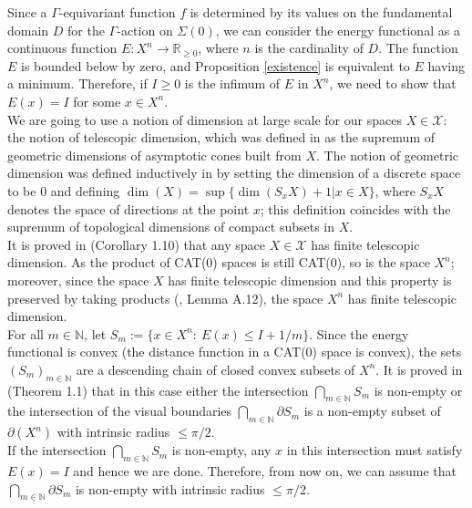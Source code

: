 \documentclass{article}
\theoremstyle{definition}
\theoremstyle{remark}
\theoremstyle{plain}
\begin{document}
Since a $\Gamma$-equivariant function $f$ is determined by its values on the fundamental domain $D$ for the $\Gamma$-action on $\Sigma(0)$, we can consider the energy functional as a continuous function $E: X^n\rightarrow\mathbb{R}_{\geq 0}$, where $n$ is the cardinality of $D$. The function $E$ is bounded below by zero, and Proposition \ref{existence} is equivalent to $E$ having a minimum. Therefore, if $I\geq 0$ is the infimum of $E$ in $X^n$, we need to show that $E(x)=I$ for some $x\in X^n$. \\

We are going to use a notion of dimension at large scale for our spaces $X\in\mathcal{X}$: the notion of telescopic dimension, which was defined in \cite{caply} as the supremum of geometric dimensions of asymptotic cones built from $X$. The notion of geometric dimension was defined inductively in \cite{kleiner} by setting the dimension of a discrete space to be $0$ and defining $\dim(X)=\sup\{\dim(S_x X)+1 | x\in X\}$, where $S_x X$ denotes the space of directions at the point $x$; this definition coincides with the supremum of topological dimensions of compact subsets in $X$. \\

It is proved in \cite{duc2015} (Corollary 1.10) that any space $X\in\mathcal{X}$ has finite telescopic dimension. As the product of CAT(0) spaces is still CAT(0), so is the space $X^n$; moreover, since the space $X$ has finite telescopic dimension and this property is preserved by taking products (\cite{caply}, Lemma A.12), the space $X^n$ has finite telescopic dimension. \\

For all $m\in\mathbb{N}$, let $S_m:=\{x\in X^n:\ E(x)\leq I+1/m\}$. Since the energy functional is convex (the distance function in a CAT(0) space is convex), the sets $(S_m)_{m\in\mathbb{N}}$ are a descending chain of closed convex subsets of $X^n$. It is proved in \cite{caply} (Theorem 1.1) that in this case either the intersection $\bigcap_{m\in\mathbb{N}}{S_m}$ is non-empty or the intersection of the visual boundaries $\bigcap_{m\in\mathbb{N}}{\partial S_m}$ is a non-empty subset of $\partial(X^n)$ with intrinsic radius $\leq\pi/2$. \\

If the intersection $\bigcap_{m\in\mathbb{N}}{S_m}$ is non-empty, any $x$ in this intersection must satisfy $E(x)=I$ and hence we are done. Therefore, from now on, we can assume that $\bigcap_{m\in\mathbb{N}}{\partial S_m}$ is non-empty with intrinsic radius $\leq\pi/2$. \\
\end{document}
